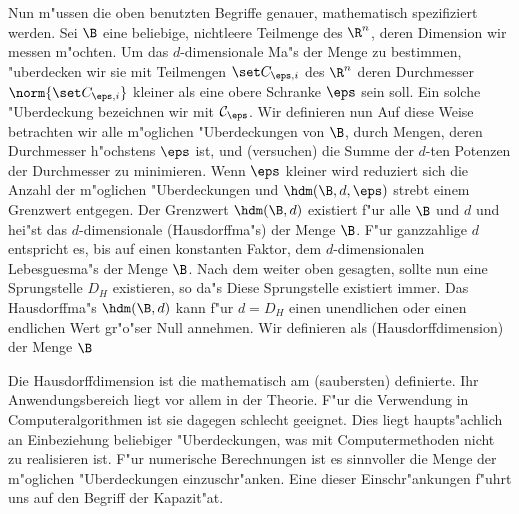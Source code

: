 Nun m"ussen die oben benutzten Begriffe genauer, mathematisch spezifiziert werden. 
Sei $\B$ eine beliebige, nichtleere Teilmenge des $\R^n$, deren Dimension wir messen m"ochten. Um das
$d$-dimensionale Ma"s  der Menge zu bestimmen, "uberdecken wir sie mit Teilmengen 
$\set C_{\eps,i}$ des $\R^n$ deren Durchmesser $\norm{\set C_{\eps,i}}$ kleiner als eine obere
Schranke $\eps$ sein soll. Ein solche "Uberdeckung bezeichnen wir mit $\mathcal
C_\eps$. Wir definieren nun 
Auf diese Weise betrachten wir alle m"oglichen "Uberdeckungen von $\B$, durch Mengen,
deren Durchmesser h"ochstens $\eps$ ist, und \naja(versuchen) die Summe der $d$-ten Potenzen der
Durchmesser zu minimieren. Wenn $\eps$ kleiner wird reduziert sich die Anzahl der
m"oglichen "Uberdeckungen und $\hdm(\B,d,\eps)$ strebt einem Grenzwert entgegen.
Der Grenzwert $\hdm(\B,d)$ existiert f"ur alle $\B$ und $d$ und hei"st das
$d$-dimensionale \begriff(Hausdorffma"s) der Menge $\B$. F"ur ganzzahlige $d$ entspricht
es, bis auf einen konstanten Faktor, dem $d$-dimensionalen Lebesguesma"s der Menge
$\B$. Nach dem weiter oben gesagten, sollte nun eine Sprungstelle $D_H$ existieren, so
da"s
Diese Sprungstelle existiert immer\footnotemark. Das Hausdorffma"s $\hdm(\B,d)$ kann f"ur
$d=D_H$ einen unendlichen oder einen endlichen Wert gr"o"ser Null annehmen\footnotemark. Wir definieren als
\begriff(Hausdorffdimension) der Menge $\B$

Die Hausdorffdimension ist die mathematisch am \naja(saubersten) definierte. Ihr
Anwendungsbereich liegt vor allem in der Theorie. F"ur die Verwendung in
Computeralgorithmen ist sie dagegen schlecht geeignet. Dies liegt haupts"achlich an
Einbeziehung beliebiger "Uberdeckungen, was mit Computermethoden nicht zu realisieren
ist. F"ur numerische Berechnungen ist es sinnvoller die Menge der m"oglichen
"Uberdeckungen einzuschr"anken. Eine dieser Einschr"ankungen f"uhrt uns auf den Begriff
der Kapazit"at.



